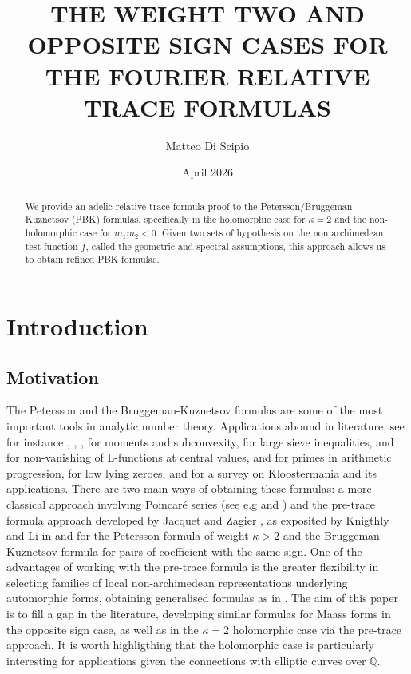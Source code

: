 \documentclass{article}
\title{\large THE WEIGHT TWO AND OPPOSITE SIGN CASES FOR THE FOURIER RELATIVE TRACE FORMULAS \normalsize}
\author{Matteo Di Scipio}
\date{April 2026}
\numberwithin{equation}{section}
\begin{document}
\maketitle
\begin{abstract} 
\noindent We provide an adelic relative trace formula proof to the Petersson/Bruggeman-Kuznetsov (PBK) formulas, specifically in the holomorphic case for $\kappa=2$ and the non-holomorphic case for $m_1m_2<0$. Given two sets of hypothesis on the non archimedean test function $f$, called the geometric and spectral assumptions, this approach allows us to obtain refined PBK formulas.
\end{abstract}
\tableofcontents
\pagebreak 

\section{Introduction}
\subsection{Motivation}


The Petersson and the Bruggeman-Kuznetsov formulas are some of the most important tools in analytic number theory. Applications abound in literature, see for instance \cite{Conrey-Iwaniec2000}, \cite{Blomer-Harcos2008}, \cite{PetrowYoung2020}, \cite{Hu-Petrow-Young-moment} for moments and subconvexity, \cite{Deshouillers} for large sieve inequalities, \cite{Duke1995} and \cite{Iwaniec-Sarnak2000} for non-vanishing of L-functions at central values, \cite{Bombieri1986} and \cite{maynard2021} for primes in arithmetic progression, \cite{Iwaniec2000} for low lying zeroes, and \cite{Michel2006Kloostermania} for a survey on Kloostermania and its applications. \bigbreak 
There are two main ways of obtaining these formulas: a more classical approach involving Poincaré series (see e.g \cite{Petersson2} and \cite{Kuznetsov}) and the pre-trace formula approach developed by Jacquet \cite{Jacquet1986} and Zagier \cite{Zagier1981}, as exposited by Knigthly and Li in \cite{KL-petersson} and \cite{KL-kuznetsov} for the  Petersson formula of weight $\kappa>2$ and the Bruggeman-Kuznetsov formula for pairs of coefficient with the same sign. 
One of the advantages of working with the pre-trace formula is the greater flexibility in selecting families of local non-archimedean representations underlying automorphic forms, obtaining generalised formulas as in \cite{generalised}. The aim of this paper is to fill a gap in the literature, developing similar formulas for Maass forms in the opposite sign case, as well as in the $\kappa = 2$ holomorphic case via the pre-trace approach. It is worth highligthing that the holomorphic case is particularly interesting for applications given the connections with elliptic curves over $\mathbb{Q}$. \bigbreak
\end{document}
